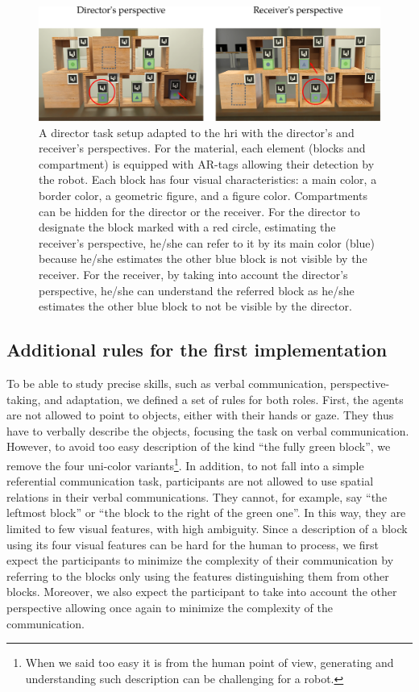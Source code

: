 \begin{figure}[ht!]
\centering
\includegraphics[width=\textwidth]{figures/chapter9/setup.png}
\caption{\label{fig:chap9_setup} A director task setup adapted to the \acrshort{hri} with the director's and receiver's perspectives. For the material, each element (blocks and compartment) is equipped with AR-tags allowing their detection by the robot. Each block has four visual characteristics: a main color, a border color, a geometric figure, and a figure color. Compartments can be hidden for the director or the receiver. For the director to designate the block marked with a red circle, estimating the receiver's perspective, he/she can refer to it by its main color (blue) because he/she estimates the other blue block is not visible by the receiver. For the receiver, by taking into account the director's perspective, he/she can understand the referred block as he/she estimates the other blue block to not be visible by the director.}
\end{figure}

\subsection{Additional rules for the first implementation}

To be able to study precise skills, such as verbal communication, perspective-taking, and adaptation, we defined a set of rules for both roles. First, the agents are not allowed to point to objects, either with their hands or gaze. They thus have to verbally describe the objects, focusing the task on verbal communication. However, to avoid too easy description of the kind ``the fully green block'', we remove the four uni-color variants\footnote{When we said too easy it is from the human point of view, generating and understanding such description can be challenging for a robot.}. In addition, to not fall into a simple referential communication task, participants are not allowed to use spatial relations in their verbal communications. They cannot, for example, say ``the leftmost block'' or ``the block to the right of the green one''. In this way, they are limited to few visual features, with high ambiguity. Since a description of a block using its four visual features can be hard for the human to process, we first expect the participants to minimize the complexity of their communication by referring to the blocks only using the features distinguishing them from other blocks. Moreover, we also expect the participant to take into account the other perspective allowing once again to minimize the complexity of the communication.

